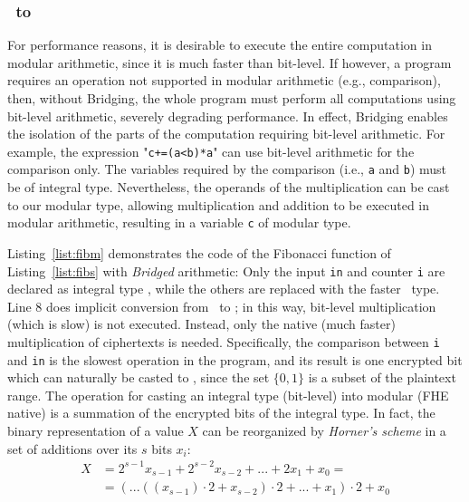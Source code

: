 \subsubsection{\secuint\ to \secmod{}}\label{sss:secuint2secmod}

For performance reasons, it is desirable to execute the entire computation in modular arithmetic, since it is much faster than bit-level. If however, a program requires an operation not supported in modular arithmetic (e.g., comparison), then, without Bridging, the whole program must perform all computations using bit-level arithmetic, severely degrading performance. 
In effect, Bridging enables the isolation of the parts of the computation requiring bit-level arithmetic.
For example, the expression "{\tt{}c+=(a<b)*a}" can use bit-level arithmetic for the comparison only.
The variables required by the comparison (i.e., \texttt{a} and \texttt{b}) must be of integral type. Nevertheless, the operands of the multiplication can be cast to our modular type, allowing multiplication and addition to be executed in modular arithmetic, resulting in a variable {\tt{}c} of modular type.



Listing~\ref{list:fibm} demonstrates the code of the Fibonacci function of Listing~\ref{list:fibs} with \emph{Bridged} arithmetic: Only the input \texttt{in} and counter \texttt{i} are declared as integral type \secuint{}, while the others are replaced with the faster \secmod\ type. 
Line 8 does implicit conversion from \secuint\ to \secmod;
in this way, bit-level multiplication (which is slow) is not executed. Instead, only the native (much faster) multiplication of ciphertexts is needed.
Specifically, the comparison between {\tt i} and {\tt in} is the slowest operation in the program, and its result is one encrypted bit which can naturally be casted to \secmod, since the set $\{0,1\}$ is a subset of the plaintext range.
The operation for casting an integral type (bit-level) into modular (FHE native) is a summation of the encrypted bits of the integral type. 
In fact, the binary representation of a value $X$ can be reorganized by {\it Horner's scheme} in a set of additions over its $s$ bits $x_i$:
\begin{equation*}
\begin{split}
X & = 2^{s-1}x_{s-1} +2^{s-2}x_{s-2} + ... + 2x_1+x_0 = \\
& =(...((x_{s-1})\cdot 2+x_{s-2})\cdot 2+...+x_1)\cdot 2+x_0
\end{split}
\end{equation*}

